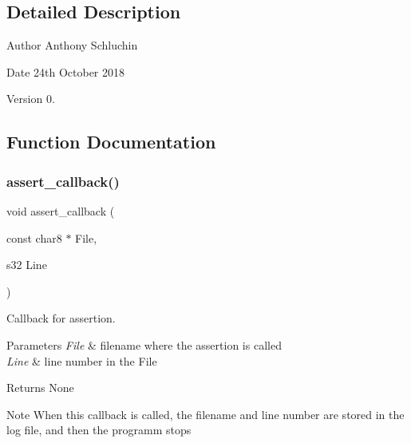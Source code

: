 \subsection{Detailed Description}
\begin{DoxyAuthor}{Author}
Anthony Schluchin 
\end{DoxyAuthor}
\begin{DoxyDate}{Date}
24th October 2018 
\end{DoxyDate}
\begin{DoxyVersion}{Version}
0. 
\end{DoxyVersion}


\subsection{Function Documentation}
\mbox{\label{interrupt_8c_a23a03be94ba72e0e76d31f48ec7be68f}} 
\subsubsection{assert\_callback()}
{\footnotesize\ttfamily void assert\+\_\+callback (\begin{DoxyParamCaption}\item[{const char8 $\ast$}]{File,  }\item[{s32}]{Line }\end{DoxyParamCaption})}



Callback for assertion. 


\begin{DoxyParams}{Parameters}
{\em File} & filename where the assertion is called \\
\hline
{\em Line} & line number in the File\\
\hline
\end{DoxyParams}
\begin{DoxyReturn}{Returns}
None
\end{DoxyReturn}
\begin{DoxyNote}{Note}
When this callback is called, the filename and line number are stored in the log file, and then the programm stops 
\end{DoxyNote}
\mbox{\label{interrupt_8c_ac42f5a05324dbc5e44b6aad6f6438b8e}} 
